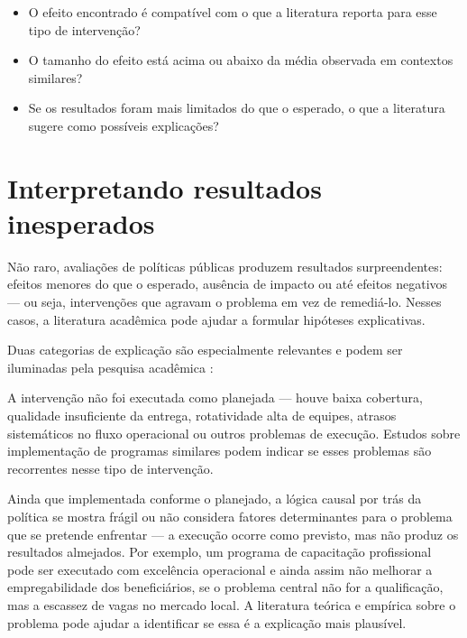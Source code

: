 \documentclass[12pt, a4paper, openany]{book}
\begin{document}
\begin{itemize}[leftmargin=*]
  \item O efeito encontrado é compatível com o que a literatura reporta para
    esse tipo de intervenção?
  \item O tamanho do efeito está acima ou abaixo da média observada em
    contextos similares?
  \item Se os resultados foram mais limitados do que o esperado, o que a
    literatura sugere como possíveis explicações?
\end{itemize}

\section{Interpretando resultados inesperados}

Não raro, avaliações de políticas públicas produzem resultados surpreendentes:
efeitos menores do que o esperado, ausência de impacto ou até efeitos
negativos --- ou seja, intervenções que agravam o problema em vez de
remediá-lo. Nesses casos, a literatura acadêmica pode ajudar a formular
hipóteses explicativas.

Duas categorias de explicação são especialmente relevantes e podem ser
iluminadas pela pesquisa acadêmica \citep{Lima2025}:

\begin{description}[leftmargin=2em]
  \item[\textbf{Falha de implementação}] A intervenção não foi executada como
    planejada --- houve baixa cobertura, qualidade insuficiente da entrega,
    rotatividade alta de equipes, atrasos sistemáticos no fluxo operacional
    ou outros problemas de execução. Estudos sobre implementação de
    programas similares podem indicar se esses problemas são recorrentes
    nesse tipo de intervenção.
  \item[\textbf{Falha de teoria}] Ainda que implementada conforme o
    planejado, a lógica causal por trás da política se mostra frágil ou não
    considera fatores determinantes para o problema que se pretende
    enfrentar --- a execução ocorre como previsto, mas não produz os
    resultados almejados. Por exemplo, um programa de capacitação
    profissional pode ser executado com excelência operacional e ainda
    assim não melhorar a empregabilidade dos beneficiários, se o problema
    central não for a qualificação, mas a escassez de vagas no mercado
    local. A literatura teórica e empírica sobre o problema pode ajudar a
    identificar se essa é a explicação mais plausível.
\end{description}
\end{document}

